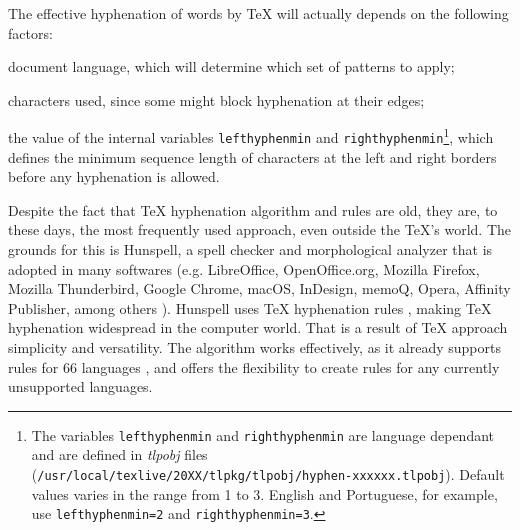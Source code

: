 The effective hyphenation of words by \TeX{} will actually depends on the following factors:
\begin{enumerate*}[label=(\arabic*)]
    \item document language, which will determine which set of patterns to apply;
    \item characters used, since some might block hyphenation at their edges;
    \item the value of the internal variables \verb|lefthyphenmin| and \verb|righthyphenmin|\footnote{
	The variables \verb|lefthyphenmin| and \verb|righthyphenmin| are language dependant and
	are defined in \emph{tlpobj} files (\verb|/usr/local/texlive/20XX/tlpkg/tlpobj/hyphen-xxxxxx.tlpobj|). 
	Default values varies in the range from 1 to 3. 
    	English and Portuguese, for example, use \verb|lefthyphenmin=2| and \verb|righthyphenmin=3|.},
        which defines the minimum sequence length of characters at the left and right borders
        before any hyphenation is allowed.
\end{enumerate*}

Despite the fact that \TeX{} hyphenation algorithm and rules are old, they are,
to these days, the most frequently used approach, even outside the \TeX{}'s
world. The grounds for this is Hunspell, a spell checker and morphological
analyzer that is adopted in many softwares (e.g. LibreOffice, OpenOffice.org,
Mozilla Firefox, Mozilla Thunderbird, Google Chrome, macOS, InDesign, memoQ,
Opera, Affinity Publisher, among others \parencite{hunspell}). Hunspell uses \TeX{}
hyphenation rules \parencite{hunspellhyphen,levien1998}, making \TeX{} hyphenation
widespread in the computer world. That is a result of \TeX{} approach
simplicity and versatility.  The algorithm works effectively, as it already
supports rules for 66 languages \parencite{texhyphenrules}, and offers the
flexibility to create rules for any currently unsupported languages.

